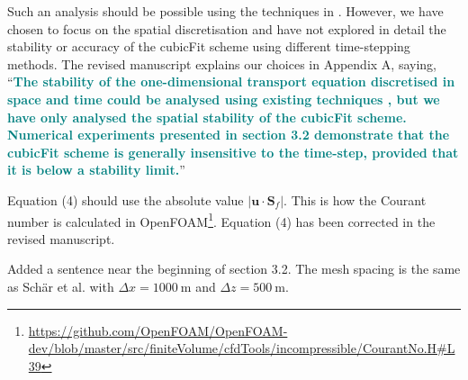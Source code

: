 \documentclass[times]{elsarticle}
\newcommand{\revtwo}[1]{\textcolor{teal}{\textbf{#1}}}
\begin{document}
\begin{quotation}
\begin{comment}
\item Might it be possible to include the time discretization (2) in the stability analysis?
It would be interesting to know if the weak instability of (2) (noted on p3) affects
the constraints (57), (58), (63).
\end{comment}
\end{quotation}
Such an analysis should be possible using the techniques in \citep{baldauf2008}.  However, we have chosen to focus on the spatial discretisation and have not explored in detail the stability or accuracy of the cubicFit scheme using different time-stepping methods.  The revised manuscript explains our choices in Appendix A, saying, ``\revtwo{The stability of the one-dimensional transport equation discretised in space and time could be analysed using existing techniques \citep{baldauf2008}, but we have only analysed the spatial stability of the cubicFit scheme.  Numerical experiments presented in section 3.2 demonstrate that the cubicFit scheme is generally insensitive to the time-step, provided that it is below a stability limit.}''

\begin{quotation}
\begin{comment}
\item The Courant number as defined by (4) would appear to vanish for a non-divergent
flow. A more natural definition might be to sum only over outflow faces (and
remove the factor $1/2$). For non-divergent flow that would be equivalent to
replacing $\mathbf{u} \cdot \mathbf{S}_f$ by $| \mathbf{u} \cdot \mathbf{S}_f |$
in~(4).
\end{comment}
\end{quotation}
Equation (4) should use the absolute value $\lvert \mathbf{u} \cdot \mathbf{S}_f \rvert$.  This is how the Courant number is calculated in OpenFOAM\footnote{\url{https://github.com/OpenFOAM/OpenFOAM-dev/blob/master/src/finiteVolume/cfdTools/incompressible/CourantNo.H\#L39}}.  Equation (4) has been corrected in the revised manuscript.

\begin{quotation}
\begin{comment}
\item Section 3.2 and Table~1: what resolution is used?
\end{comment}
\end{quotation}
Added a sentence near the beginning of section 3.2.  The mesh spacing is the same as Sch\"ar et al. \citep{schaer2002} with $\Delta x = \SI{1000}{\meter}$ and $\Delta z = \SI{500}{\meter}$.
\end{document}
